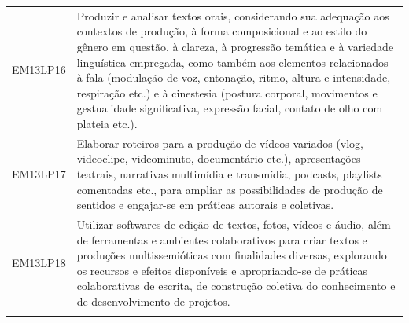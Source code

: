 \documentclass[12pt]{extarticle}
\begin{document}
\begin{longtable}{ll}
EM13LP16   & Produzir e analisar textos orais, considerando sua adequação aos contextos de produção, à forma composicional e ao estilo do gênero em questão, à clareza, à progressão temática e à variedade linguística empregada, como também aos elementos relacionados à fala (modulação de voz, entonação, ritmo, altura e intensidade, respiração etc.) e à cinestesia (postura corporal, movimentos e gestualidade significativa, expressão facial, contato de olho com plateia etc.).                                                                                                                                                                                                                                                                                                                                       \\
\rowcolor[HTML]{E0F7FA} 
EM13LP17   & Elaborar roteiros para a produção de vídeos variados (vlog, videoclipe, videominuto, documentário etc.), apresentações teatrais, narrativas multimídia e transmídia, podcasts, playlists comentadas etc., para ampliar as possibilidades de produção de sentidos e engajar-se em práticas autorais e coletivas.                                                                                                                                                                                                                                                                                                                                                                                                                                                                                                       \\
\rowcolor[HTML]{FFF} 
EM13LP18   & Utilizar softwares de edição de textos, fotos, vídeos e áudio, além de ferramentas e ambientes colaborativos para criar textos e produções multissemióticas com finalidades diversas, explorando os recursos e efeitos disponíveis e apropriando-se de práticas colaborativas de escrita, de construção coletiva do conhecimento e de desenvolvimento de projetos.                                                                                                                                                                                                                                                                                                                                                                                                                                                    \\
\rowcolor[HTML]{E0F7FA} 

\end{longtable}
\end{document}
